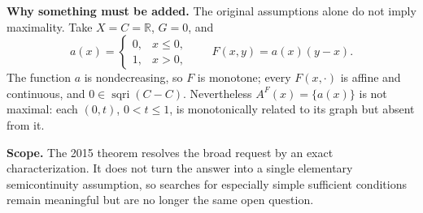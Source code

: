 \documentclass[11pt]{article}
\newcommand{\R}{\mathbb R}
\begin{document}
\textbf{Why something must be added.}  The original assumptions alone do
not imply maximality.  Take $X=C=\R$, $G=0$, and
\[
 a(x)=\begin{cases}0,&x\le0,\\1,&x>0,\end{cases}
 \qquad F(x,y)=a(x)(y-x).
\]
The function $a$ is nondecreasing, so $F$ is monotone; every $F(x,\cdot)$ is
affine and continuous, and $0\in\operatorname{sqri}(C-C)$.  Nevertheless
$A^F(x)=\{a(x)\}$ is not maximal: each $(0,t)$, $0<t\le1$, is monotonically
related to its graph but absent from it.

\textbf{Scope.}  The 2015 theorem resolves the broad request by an exact
characterization.  It does not turn the answer into a single elementary
semicontinuity assumption, so searches for especially simple sufficient
conditions remain meaningful but are no longer the same open question.

\newpage
\thispagestyle{empty}


\end{document}
